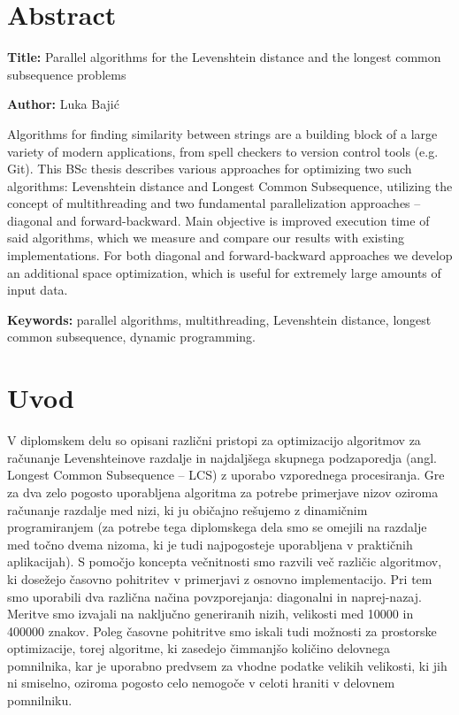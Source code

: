 \documentclass[a4paper,12pt,openright]{book}
\newcommand{\ttitleEn}{Parallel algorithms for the Levenshtein distance and the longest common subsequence problems}
\newcommand{\tauthor}{Luka Bajić}
\newcommand{\tkeywordsEn}{parallel algorithms, multithreading, Levenshtein distance, longest common subsequence, dynamic programming}
\newcommand{\clearemptydoublepage}{\newpage{\pagestyle{empty}\cleardoublepage}}
\begin{document}
\chapter*{Abstract}

\noindent\textbf{Title:} \ttitleEn
\bigskip

\noindent\textbf{Author:} \tauthor
\bigskip

\noindent Algorithms for finding similarity between strings are a building block of a large variety of modern applications, from spell checkers to version control tools (e.g. Git). This BSc thesis describes various approaches for optimizing two such algorithms: Levenshtein distance and Longest Common Subsequence, utilizing the concept of multithreading and two fundamental parallelization approaches -- diagonal and forward-backward. Main objective is improved execution time of said algorithms, which we measure and compare our results with existing implementations. For both diagonal and forward-backward approaches we develop an additional space optimization, which is useful for extremely large amounts of input data.

\bigskip

\noindent\textbf{Keywords:} \tkeywordsEn.
\clearemptydoublepage

\mainmatter
\setcounter{page}{1}
\pagestyle{fancy}

\chapter{Uvod}

V diplomskem delu so opisani različni pristopi za optimizacijo algoritmov za računanje Levenshteinove razdalje in najdaljšega skupnega podzaporedja (angl. Longest Common Subsequence -- LCS) z uporabo vzporednega procesiranja. Gre za dva zelo pogosto uporabljena algoritma za potrebe primerjave nizov oziroma računanje razdalje med nizi, ki ju običajno rešujemo z dinamičnim programiranjem (za potrebe tega diplomskega dela smo se omejili na razdalje med točno dvema nizoma, ki je tudi najpogosteje uporabljena v praktičnih aplikacijah). S pomočjo koncepta večnitnosti smo razvili več različic algoritmov, ki dosežejo časovno pohitritev v primerjavi z osnovno implementacijo. Pri tem smo uporabili dva različna načina povzporejanja: diagonalni in naprej-nazaj. Meritve smo izvajali na naključno generiranih nizih, velikosti med 10000 in 400000 znakov. Poleg časovne pohitritve smo iskali tudi možnosti za prostorske optimizacije, torej algoritme, ki zasedejo čimmanjšo količino delovnega pomnilnika, kar je uporabno predvsem za vhodne podatke velikih velikosti, ki jih ni smiselno, oziroma pogosto celo nemogoče v celoti hraniti v delovnem pomnilniku. 
\end{document}
